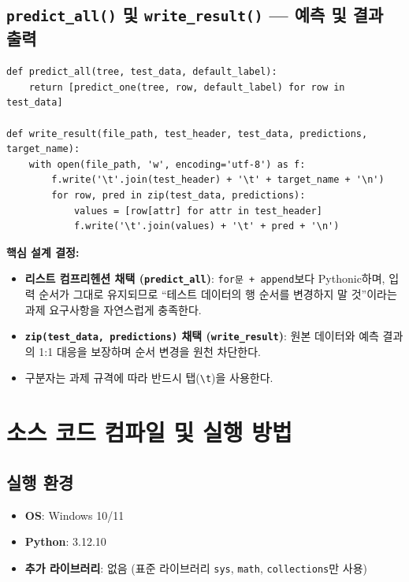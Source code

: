 \documentclass[12pt, a4paper]{article}
\begin{document}
\subsection{\texttt{predict\_all()} 및 \texttt{write\_result()} --- 예측 및 결과 출력}

\begin{verbatim}
def predict_all(tree, test_data, default_label):
    return [predict_one(tree, row, default_label) for row in test_data]

def write_result(file_path, test_header, test_data, predictions, target_name):
    with open(file_path, 'w', encoding='utf-8') as f:
        f.write('\t'.join(test_header) + '\t' + target_name + '\n')
        for row, pred in zip(test_data, predictions):
            values = [row[attr] for attr in test_header]
            f.write('\t'.join(values) + '\t' + pred + '\n')
\end{verbatim}

\noindent\textbf{핵심 설계 결정:}
\begin{itemize}
    \item \textbf{리스트 컴프리헨션 채택 (\texttt{predict\_all})}: \texttt{for문 + append}보다 Pythonic하며, 입력 순서가 그대로 유지되므로 ``테스트 데이터의 행 순서를 변경하지 말 것''이라는 과제 요구사항을 자연스럽게 충족한다.
    \item \textbf{\texttt{zip(test\_data, predictions)} 채택 (\texttt{write\_result})}: 원본 데이터와 예측 결과의 1:1 대응을 보장하며 순서 변경을 원천 차단한다.
    \item 구분자는 과제 규격에 따라 반드시 탭(\texttt{\textbackslash t})을 사용한다.
\end{itemize}


\section{소스 코드 컴파일 및 실행 방법}

\subsection{실행 환경}
\begin{itemize}
    \item \textbf{OS}: Windows 10/11
    \item \textbf{Python}: 3.12.10
    \item \textbf{추가 라이브러리}: 없음 (표준 라이브러리 \texttt{sys}, \texttt{math}, \texttt{collections}만 사용)
\end{itemize}
\end{document}
